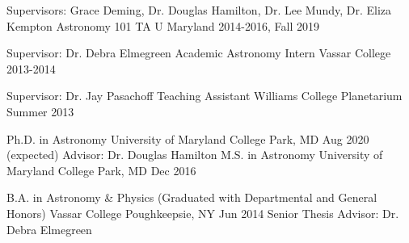 \documentclass[]{awesome-cv}
\begin{document}
\vspace{-5mm}

\begin{cventries}

	\cventry
	{Supervisors: Grace Deming, Dr. Douglas Hamilton, Dr. Lee Mundy, Dr. Eliza Kempton}
	{Astronomy 101 TA}
	{U Maryland}
	{2014-2016, Fall 2019}
	{}
		
	\vspace{-6mm}
	\cventry
	{Supervisor: Dr. Debra Elmegreen}
	{Academic Astronomy Intern}
	{Vassar College}
	{2013-2014}
	{}
		
	\vspace{-6mm}
	\cventry
	{Supervisor: Dr. Jay Pasachoff}
	{Teaching Assistant}
	{Williams College Planetarium}
	{Summer 2013}
	{}
\end{cventries}

\vspace{-5mm}

\begin{cventries}
	\cventry
	{Ph.D. in Astronomy}
	{University of Maryland}
	{College Park, MD}
	{Aug 2020 (expected)}
	{Advisor: Dr. Douglas Hamilton}
	\cventry
	{M.S. in Astronomy}
	{University of Maryland}
	{College Park, MD}
	{Dec 2016}
	{}
	
	\vspace{-6mm}
	\cventry
	{B.A. in Astronomy \& Physics (Graduated with Departmental and General Honors)}
	{Vassar College}
	{Poughkeepsie, NY}
	{Jun 2014}
	{Senior Thesis Advisor: Dr. Debra Elmegreen}
\end{cventries}
\end{document}

